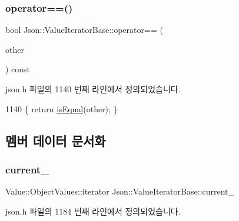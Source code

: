 \subsubsection{\texorpdfstring{operator==()}{operator==()}}
{\footnotesize\ttfamily bool Json\+::\+Value\+Iterator\+Base\+::operator== (\begin{DoxyParamCaption}\item[{const \hyperlink{class_json_1_1_value_iterator_base_a9d2a940d03ea06d20d972f41a89149ee}{Self\+Type} \&}]{other }\end{DoxyParamCaption}) const\hspace{0.3cm}{\ttfamily [inline]}}



json.\+h 파일의 1140 번째 라인에서 정의되었습니다.


\begin{DoxyCode}
1140 \{ \textcolor{keywordflow}{return} \hyperlink{class_json_1_1_value_iterator_base_a010b5ad3f3337ae3732e5d7e16ca5e25}{isEqual}(other); \}
\end{DoxyCode}


\subsection{멤버 데이터 문서화}
\mbox{\label{class_json_1_1_value_iterator_base_ab3138ce8af8301cca3b041ea55cb922a}} 
\subsubsection{\texorpdfstring{current\+\_\+}{current\_}}
{\footnotesize\ttfamily Value\+::\+Object\+Values\+::iterator Json\+::\+Value\+Iterator\+Base\+::current\+\_\+\hspace{0.3cm}{\ttfamily [private]}}



json.\+h 파일의 1184 번째 라인에서 정의되었습니다.

\mbox{\label{class_json_1_1_value_iterator_base_a3e08b114a1aed9bde518c527f94a8c59}} 
